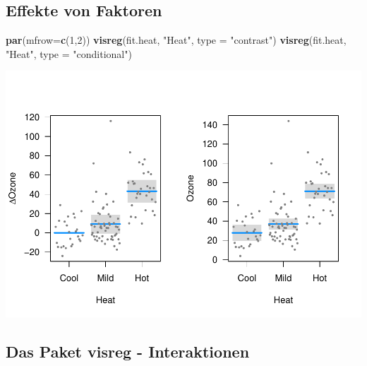 \documentclass[]{article}
\newenvironment{Shaded}{\begin{snugshade}}{\end{snugshade}}
\newcommand{\KeywordTok}[1]{\textcolor[rgb]{0.13,0.29,0.53}{\textbf{{#1}}}}
\newcommand{\DataTypeTok}[1]{\textcolor[rgb]{0.13,0.29,0.53}{{#1}}}
\newcommand{\DecValTok}[1]{\textcolor[rgb]{0.00,0.00,0.81}{{#1}}}
\newcommand{\StringTok}[1]{\textcolor[rgb]{0.31,0.60,0.02}{{#1}}}
\newcommand{\NormalTok}[1]{{#1}}
\begin{document}
\subsection{Effekte von Faktoren}\label{effekte-von-faktoren}

\begin{Shaded}
\begin{Highlighting}[]
\KeywordTok{par}\NormalTok{(}\DataTypeTok{mfrow=}\KeywordTok{c}\NormalTok{(}\DecValTok{1}\NormalTok{,}\DecValTok{2}\NormalTok{))}
\KeywordTok{visreg}\NormalTok{(fit.heat, }\StringTok{"Heat"}\NormalTok{, }\DataTypeTok{type =} \StringTok{"contrast"}\NormalTok{)}
\KeywordTok{visreg}\NormalTok{(fit.heat, }\StringTok{"Heat"}\NormalTok{, }\DataTypeTok{type =} \StringTok{"conditional"}\NormalTok{)}
\end{Highlighting}
\end{Shaded}

\includegraphics{Intro_Datenanalyse1_files/figure-latex/unnamed-chunk-283-1.pdf}

\subsection{Das Paket visreg -
Interaktionen}\label{das-paket-visreg---interaktionen}

\begin{Shaded}
\end{Shaded}
\end{document}
